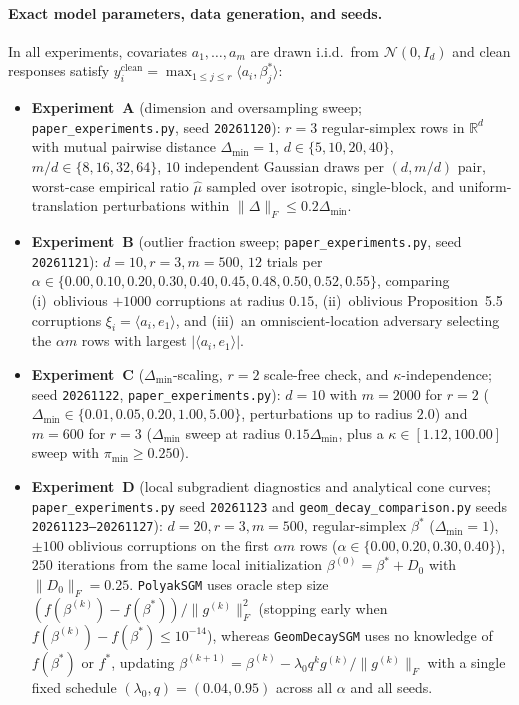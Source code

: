 \documentclass[11pt]{article}
\newcommand{\R}{\mathbb{R}}
\newcommand{\ip}[2]{\langle #1, #2 \rangle}
\newcommand{\Fnorm}[1]{\|#1\|_F}
\begin{document}
\paragraph{Exact model parameters, data generation, and seeds.}
In all experiments, covariates $a_1, \dots, a_m$ are drawn i.i.d.\ from $\mathcal{N}(0, I_d)$ and clean responses satisfy $y_i^{\mathrm{clean}} = \max_{1 \le j \le r} \ip{a_i}{\beta_j^*}$:
\begin{itemize}
  \item \textbf{Experiment~A} (dimension and oversampling sweep; \nolinkurl{paper_experiments.py}, seed \texttt{20261120}): $r = 3$ regular-simplex rows in $\R^d$ with mutual pairwise distance $\Delta_{\min} = 1$, $d \in \{5, 10, 20, 40\}$, $m/d \in \{8, 16, 32, 64\}$, $10$ independent Gaussian draws per $(d, m/d)$ pair, worst-case empirical ratio $\hat\mu$ sampled over isotropic, single-block, and uniform-translation perturbations within $\Fnorm{\Delta} \le 0.2\Delta_{\min}$.
  \item \textbf{Experiment~B} (outlier fraction sweep; \nolinkurl{paper_experiments.py}, seed \texttt{20261121}): $d = 10, r = 3, m = 500$, $12$ trials per $\alpha \in \{0.00, 0.10, 0.20, 0.30, 0.40, 0.45, 0.48, 0.50, 0.52, 0.55\}$, comparing (i)~oblivious $+1000$ corruptions at radius $0.15$, (ii)~oblivious Proposition~5.5 corruptions $\xi_i = \ip{a_i}{e_1}$, and (iii)~an omniscient-location adversary selecting the $\alpha m$ rows with largest $|\ip{a_i}{e_1}|$.
  \item \textbf{Experiment~C} ($\Delta_{\min}$-scaling, $r = 2$ scale-free check, and $\kappa$-independence; seed \texttt{20261122}, \nolinkurl{paper_experiments.py}): $d = 10$ with $m = 2000$ for $r = 2$ ($\Delta_{\min} \in \{0.01, 0.05, 0.20, 1.00, 5.00\}$, perturbations up to radius $2.0$) and $m = 600$ for $r = 3$ ($\Delta_{\min}$ sweep at radius $0.15\Delta_{\min}$, plus a $\kappa \in [1.12, 100.00]$ sweep with $\pi_{\min} \ge 0.250$).
  \item \textbf{Experiment~D} (local subgradient diagnostics and analytical cone curves; \nolinkurl{paper_experiments.py} seed \texttt{20261123} and \nolinkurl{geom_decay_comparison.py} seeds \texttt{20261123--20261127}): $d = 20, r = 3, m = 500$, regular-simplex $\beta^*$ ($\Delta_{\min} = 1$), $\pm 100$ oblivious corruptions on the first $\alpha m$ rows ($\alpha \in \{0.00, 0.20, 0.30, 0.40\}$), $250$ iterations from the same local initialization $\beta^{(0)} = \beta^* + D_0$ with $\Fnorm{D_0} = 0.25$. \texttt{PolyakSGM} uses oracle step size $(f(\beta^{(k)}) - f(\beta^*))/\Fnorm{g^{(k)}}^2$ (stopping early when $f(\beta^{(k)}) - f(\beta^*) \le 10^{-14}$), whereas \texttt{GeomDecaySGM} uses no knowledge of $f(\beta^*)$ or $f^*$, updating $\beta^{(k+1)} = \beta^{(k)} - \lambda_0 q^k g^{(k)}/\Fnorm{g^{(k)}}$ with a single fixed schedule $(\lambda_0, q) = (0.04, 0.95)$ across all $\alpha$ and all seeds.
\end{itemize}
\end{document}
